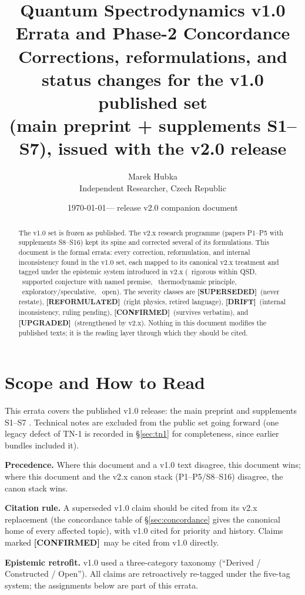 \documentclass[11pt,a4paper]{article}
\title{\textbf{Quantum Spectrodynamics v1.0}\\ Errata and Phase-2 Concordance\\[0.6em]
\large Corrections, reformulations, and status changes for the v1.0
published set\\ (main preprint + supplements S1--S7), issued with the v2.0 release}
\author{Marek Hubka\\
\small Independent Researcher, Czech Republic}
\date{\today --- release v2.0 companion document}
\newcommand{\SUP}{\textcolor{Ecolor}{\textbf{[SUPERSEDED]}}}     %
\newcommand{\REF}{\textcolor{Icolor}{\textbf{[REFORMULATED]}}}   %
\newcommand{\DRIFT}{\textcolor{Scolor}{\textbf{[DRIFT]}}}        %
\newcommand{\OK}{\textcolor{Rcolor}{\textbf{[CONFIRMED]}}}       %
\newcommand{\UP}{\textcolor{Cpcolor}{\textbf{[UPGRADED]}}}       %
\begin{document}
\maketitle

\begin{abstract}
\noindent
The v1.0 set \cite{Hubka2026QSD, Hubka2026QSDSupp} is frozen as published. The v2.x research programme (papers P1--P5 with supplements S8--S16) kept its spine and corrected several of its formulations. This document is the formal errata: every correction, reformulation, and internal inconsistency found in the v1.0 set, each mapped to its canonical v2.x treatment and tagged under the epistemic system introduced in v2.x (\Rmark\ rigorous within QSD, \Cpmark\ supported conjecture with named premise, \Tmark\ thermodynamic principle, \EXPmark\ exploratory/speculative, \Omark\ open). The severity classes are \SUP\ (never restate), \REF\ (right physics, retired language), \DRIFT\ (internal inconsistency, ruling pending), \OK\ (survives verbatim), and \UP\ (strengthened by v2.x). Nothing in this document modifies the published texts; it is the reading layer through which they should be cited.
\end{abstract}

\section{Scope and How to Read}

This errata covers the published v1.0 release: the main preprint \cite{Hubka2026QSD} and supplements S1--S7 \cite{Hubka2026QSDSupp}. Technical notes are excluded from the public set going forward (one legacy defect of TN-1 is recorded in \S\ref{sec:tn1} for completeness, since earlier bundles included it).

\textbf{Precedence.} Where this document and a v1.0 text disagree, this document wins; where this document and the v2.x canon stack (P1--P5/S8--S16) disagree, the canon stack wins.

\textbf{Citation rule.} A superseded v1.0 claim should be cited from its v2.x replacement (the concordance table of \S\ref{sec:concordance} gives the canonical home of every affected topic), with v1.0 cited for priority and history. Claims marked \OK\ may be cited from v1.0 directly.

\textbf{Epistemic retrofit.} v1.0 used a three-category taxonomy (``Derived / Constructed / Open''). All claims are retroactively re-tagged under the five-tag system; the assignments below are part of this errata.
\end{document}
